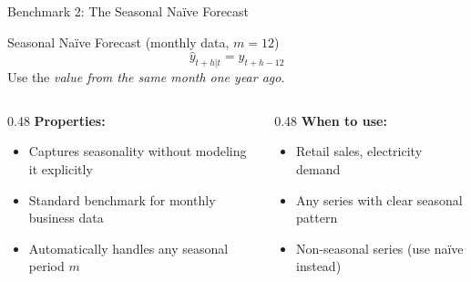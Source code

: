 \documentclass[aspectratio=169, 11pt]{beamer}
\begin{document}
\begin{frame}{Benchmark 2: The Seasonal Na\"{i}ve Forecast}
  \begin{definitionbox}{Seasonal Na\"{i}ve Forecast (monthly data, $m = 12$)}
    \[
      \hat{y}_{t+h|t} = y_{t+h-12}
    \]
    Use the \emph{value from the same month one year ago}.
    \smallskip

  \end{definitionbox}
  \vspace{0.1cm}
  \begin{columns}[T]
    \begin{column}{0.48\textwidth}
      \textbf{Properties:}
      \begin{itemize}
        \item Captures seasonality without modeling it explicitly
        \item Standard benchmark for monthly business data
        \item Automatically handles any seasonal period $m$
      \end{itemize}
    \end{column}
    \begin{column}{0.48\textwidth}
      \textbf{When to use:}
      \begin{itemize}
        \item[\pos{$\checkmark$}] Retail sales, electricity demand
        \item[\pos{$\checkmark$}] Any series with clear seasonal pattern
        \item[\negc{$\times$}] Non-seasonal series (use na\"{i}ve instead)
      \end{itemize}
      \vspace{0.2cm}
    \end{column}
  \end{columns}
\end{frame}
\end{document}
